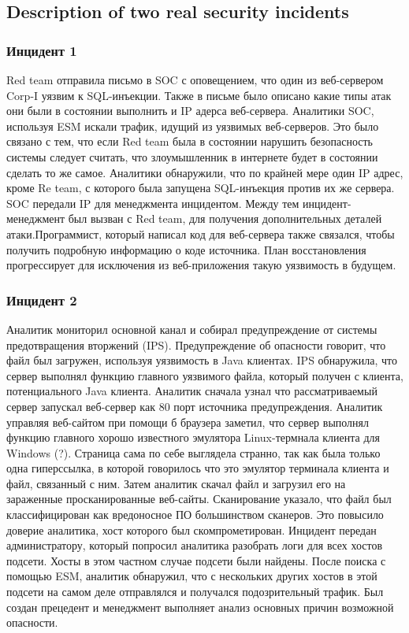 \documentclass[12pt,]{article}
\begin{document}
\subsection{Description of two real security incidents}
\subsubsection{Инцидент 1}
Red team отправила письмо в SOC с оповещением, что один из веб-сервером Corp-I уязвим к SQL-инъекции. Также в письме было описано какие типы атак они были в состоянии выполнить и IP адерса веб-сервера. Аналитики SOC, используя ESM искали трафик, идущий из уязвимых веб-серверов. Это было связано с тем, что если Red team  была в состоянии нарушить безопасность системы следует считать, что злоумышленник в интернете будет в состоянии сделать то же самое. Аналитики обнаружили, что по крайней мере один IP адрес, кроме Re team, с которого была запущена SQL-инъекция против их же сервера. SOC передали IP для менеджмента инцидентом. Между тем инцидент-менеджмент был вызван с Red team, для получения дополнительных деталей атаки.Программист, который написал код для веб-сервера также связался, чтобы получить подробную информацию о коде источника. План восстановления прогрессирует для исключения из веб-приложения такую уязвимость в будущем.
\subsubsection{Инцидент 2}
Аналитик мониторил основной канал и собирал предупреждение от системы предотвращения вторжений (IPS). Предупреждение об опасности говорит, что файл был загружен, используя уязвимость в Java клиентах. IPS обнаружила, что сервер выполнял функцию главного уязвимого файла, который получен с клиента, потенциального Java клиента. Аналитик сначала узнал что рассматриваемый сервер запускал веб-сервер как 80 порт источника предупреждения. Аналитик управляя веб-сайтом при помощи б браузера заметил, что сервер выполнял функцию главного хорошо известного эмулятора Linux-термнала клиента для Windows (?). Страница сама по себе выглядела странно, так как была только одна гиперссылка, в которой говорилось что это эмулятор терминала клиента и файл, связанный с ним. Затем аналитик скачал файл и загрузил его на зараженные просканированные веб-сайты. Сканирование указало, что файл был классифицирован как вредоносное ПО большинством сканеров. Это повысило доверие аналитика, хост которого был скомпрометирован. Инцидент передан администратору, который попросил аналитика разобрать логи для всех хостов подсети. Хосты в этом частном случае подсети были найдены. После поиска с помощью ESM, аналитик обнаружил, что с нескольких других хостов в этой подсети на самом деле отправлялся и получался подозрительный трафик. Был создан прецедент и менеджмент выполняет анализ основных причин возможной опасности.
\end{document}
